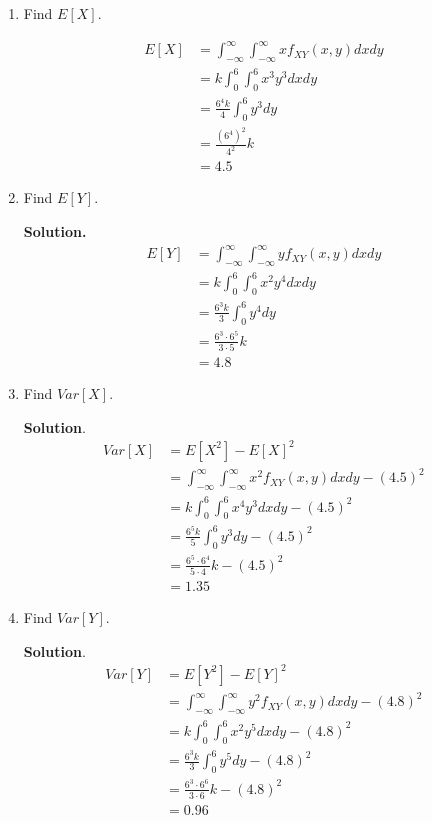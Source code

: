 \documentclass[12pt]{article}
\begin{document}
\begin{enumerate}
    \item Find $E[X]$.

    \begin{align*}
        E[X] &= \int_{-\infty}^\infty\int_{-\infty}^\infty x f_{XY}(x,y)dxdy
        \\ &= k\int_0^6 \int_0^6 x^3y^3 dxdy
        \\ &= \frac{6^4 k}{4} \int_0^6 y^3 dy
        \\ &= \frac{(6^4)^2}{4^2}k
        \\ &= 4.5
    \end{align*}

    \item Find $E[Y]$.
    
    \textbf{Solution.}
    \begin{align*}
        E[Y] &= \int_{-\infty}^\infty\int_{-\infty}^\infty y f_{XY}(x,y)dxdy
        \\ &= k\int_0^6 \int_0^6 x^2y^4 dxdy
        \\ &= \frac{6^3 k}{3} \int_0^6 y^4 dy
        \\ &= \frac{6^3 \cdot 6^5}{3\cdot 5}k
        \\ &= 4.8
    \end{align*}

    \item Find $Var[X]$.

    \textbf{Solution}.
    \begin{align*}
        Var[X] &= E[X^2]-E[X]^2
        \\ &= \int_{-\infty}^\infty\int_{-\infty}^\infty x^2 f_{XY}(x,y)dxdy - (4.5)^2
        \\ &= k \int_0^6 \int_0^6 x^4 y^3 dxdy - (4.5)^2
        \\ &= \frac{6^5 k}{5} \int_0^6 y^3 dy - (4.5)^2
        \\ &= \frac{6^5 \cdot 6^4 }{5 \cdot 4}k - (4.5)^2
        \\ &= 1.35
    \end{align*}

    \item Find $Var[Y]$.

    \textbf{Solution}.
    \begin{align*}
        Var[Y] &= E[Y^2]-E[Y]^2
        \\ &= \int_{-\infty}^\infty\int_{-\infty}^\infty y^2 f_{XY}(x,y)dxdy - (4.8)^2
        \\ &= k \int_0^6 \int_0^6 x^2 y^5 dxdy - (4.8)^2
        \\ &= \frac{6^3 k}{3} \int_0^6 y^5 dy - (4.8)^2
        \\ &= \frac{6^3 \cdot 6^6 }{3 \cdot 6}k - (4.8)^2
        \\ &= 0.96
    \end{align*}


\end{enumerate}
\end{document}
